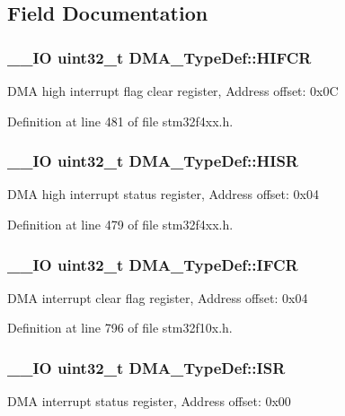 \subsection{Field Documentation}
\hypertarget{struct_d_m_a___type_def_a1e4f50b935bab2520788ae936f2e55c1}{
\subsubsection[{H\-I\-F\-C\-R}]{\setlength{\rightskip}{0pt plus 5cm}\-\_\-\-\_\-\-I\-O {\bf uint32\-\_\-t} D\-M\-A\-\_\-\-Type\-Def\-::\-H\-I\-F\-C\-R}}\label{struct_d_m_a___type_def_a1e4f50b935bab2520788ae936f2e55c1}
D\-M\-A high interrupt flag clear register, Address offset\-: 0x0\-C 

Definition at line 481 of file stm32f4xx.\-h.

\hypertarget{struct_d_m_a___type_def_a01a90a5fcd6459e10b81c0ab737dd2e3}{
\subsubsection[{H\-I\-S\-R}]{\setlength{\rightskip}{0pt plus 5cm}\-\_\-\-\_\-\-I\-O {\bf uint32\-\_\-t} D\-M\-A\-\_\-\-Type\-Def\-::\-H\-I\-S\-R}}\label{struct_d_m_a___type_def_a01a90a5fcd6459e10b81c0ab737dd2e3}
D\-M\-A high interrupt status register, Address offset\-: 0x04 

Definition at line 479 of file stm32f4xx.\-h.

\hypertarget{struct_d_m_a___type_def_a30576220ca1968e61666d92092e8911e}{
\subsubsection[{I\-F\-C\-R}]{\setlength{\rightskip}{0pt plus 5cm}\-\_\-\-\_\-\-I\-O {\bf uint32\-\_\-t} D\-M\-A\-\_\-\-Type\-Def\-::\-I\-F\-C\-R}}\label{struct_d_m_a___type_def_a30576220ca1968e61666d92092e8911e}
D\-M\-A interrupt clear flag register, Address offset\-: 0x04 

Definition at line 796 of file stm32f10x.\-h.

\hypertarget{struct_d_m_a___type_def_aa341a859df2f59bf6c0f7a000ab8734b}{
\subsubsection[{I\-S\-R}]{\setlength{\rightskip}{0pt plus 5cm}\-\_\-\-\_\-\-I\-O {\bf uint32\-\_\-t} D\-M\-A\-\_\-\-Type\-Def\-::\-I\-S\-R}}\label{struct_d_m_a___type_def_aa341a859df2f59bf6c0f7a000ab8734b}
D\-M\-A interrupt status register, Address offset\-: 0x00 

